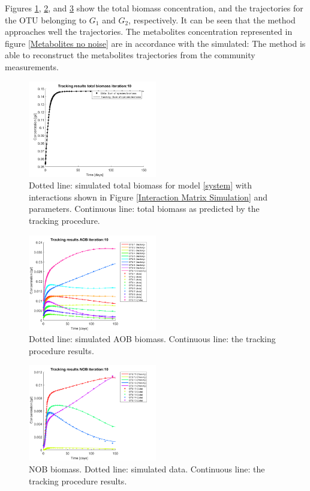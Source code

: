 \documentclass[3p,times]{elsarticle}
\begin{document}
Figures \ref{Total Biomass no noise}, \ref{AOB no noise}, and \ref{NOB no noise} show the total biomass concentration, and the trajectories for the OTU belonging to $G_1$ and $G_2$, respectively. It can be seen that the method approaches well the trajectories. The metabolites concentration represented in figure \ref{Metabolites no noise} are in accordance with the simulated: The method is able to reconstruct the metabolites trajectories from the community measurements. 


\begin{figure}[h]
	\centering
	\includegraphics[width=0.5\textwidth]{Synthetic_data//lambda_=_e-4//191209_no_noise_Biomass_Iter_10}
	\caption{Dotted line: simulated total biomass for model \eqref{system} with interactions shown in Figure \ref{Interaction Matrix Simulation} and parameters. Continuous line: total biomass as predicted  by the tracking procedure.}
	\label{Total Biomass no noise}
\end{figure}
\begin{figure}[h]
	\centering
	\includegraphics[width=0.5\textwidth]{Synthetic_data//lambda_=_e-4//191209_no_noise_AOB_Iter_10}
	\caption{Dotted line: simulated AOB biomass. Continuous line: the tracking procedure results.}
	\label{AOB no noise}
\end{figure}
\begin{figure}[h]
	\centering
	\includegraphics[width=0.5\textwidth]{Synthetic_data//lambda_=_e-4//191209_no_noise_NOB_Iter_10}
	\caption{NOB biomass. Dotted line: simulated data. Continuous line: the tracking procedure results.}
	\label{NOB no noise}
\end{figure}
\end{document}
